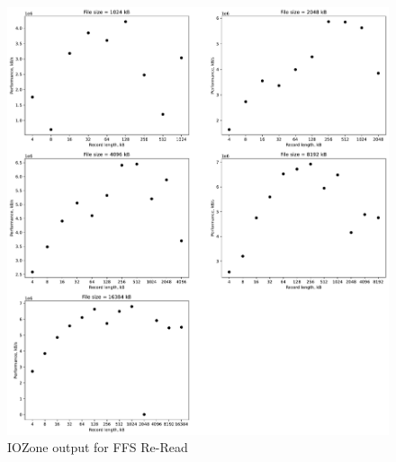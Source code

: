 \begin{figure}[!htb]
	\label{fig:app_bench_ffs_rnd_read}
	\begin{center}
		\includegraphics[width=1.0\textwidth]{figures/benchmarking/ffs/Re-Read.pdf}
	\end{center}
	\caption{IOZone output for FFS Re-Read}
\end{figure}


